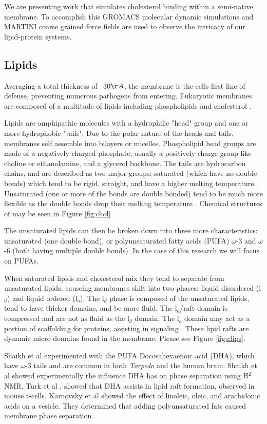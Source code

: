 \documentclass[10pt, letterpaper]{article}
\begin{document}
We are presenting work that simulates cholesterol binding within a semi-native membrane. To accomplish this GROMACS molecular dynamic simulations and MARTINI coarse grained force fields are used to observe the intricacy of our lipid-protein systems.

\subsection{Lipids}

Averaging a total thickness of ~30$\AA$, the membrane is the cells first line of defense, preventing numerous pathogens from entering. Eukaryotic membranes are composed of a multitude of lipids including phospholipids and cholesterol \cite{meermembrane2008}. 

Lipids are amphipathic molecules with a hydrophilic "head" group and one or more hydrophobic "tails". Due to the polar nature of the heads and tails, membranes self assemble into bilayers or micelles. Phospholipid head groups are made of a negatively charged phosphate, usually a positively charge group like choline or ethanolamine, and a glycerol backbone. The tails are hydrocarbon chains, and are described as two major groups: saturated (which have no double bonds) which tend to be rigid, straight, and have a higher melting temperature. Unsaturated (one or more of the bonds are double bonded) tend to be much more flexible as the double bonds drop their melting temperature \cite{benjamins_hajra_agranoff_2006}. Chemical structures of may be seen in Figure \ref{fig:chol}

The unsaturated lipids can then be broken down into three more characteristics: unsaturated (one double bond), or polyunsaturated fatty acids (PUFA) $\omega$-3 and $\omega$-6 (both having multiple double bonds). In the case of this research we will focus on PUFAs.

When saturated lipids and cholesterol mix they tend to separate from unsaturated lipids, causeing membranes shift into two phases: liquid disordered (l$_d$) and liquid ordered (l$_o$). The l$_d$ phase is composed of the unsaturated lipids, tend to have thicker domains, and be more fluid. The l$_o$/raft domain is compressed and are not as fluid as the l$_d$ domain. The l$_o$ domain may act as a portion of scaffolding for proteins, assisting in signaling \cite{meermembrane2008}. These lipid rafts are dynamic micro domains found in the membrane. Please see Figure \ref{fig:clips}. 

Shaikh et al \cite{shaikholeic2004} experimented with the PUFA Docosahexaenoic acid (DHA), which have $\omega$-3 tails and are common in both \textit{Torpedo} and the human brain. Shaikh et al showed experimentally the influence DHA has on phase separation using H$^2$NMR. Turk et al \cite{turkmembrane2013}, showed that DHA assists in lipid raft formation, observed in mouse t-cells. Karnovsky et al \cite{jilausner_kleinfeld_hoover_karnovsky_1980} showed the effect of linoleic, oleic, and arachidonic acids on a vesicle. They determined that adding polyunsaturated fats caused membrane phase separation.
 
\end{document}
